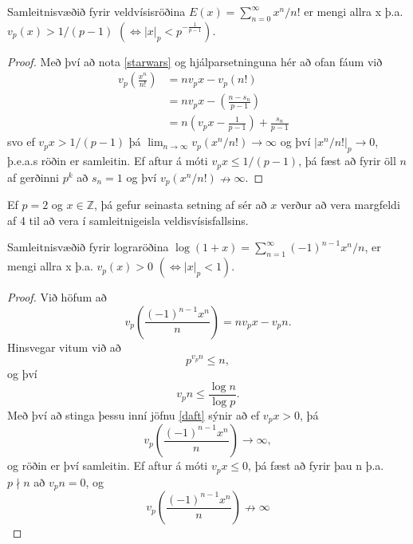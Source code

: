 \begin{setn}
Samleitnisvæðið fyrir veldvísisröðina $E(x) = \sum_{n=0}^{\infty} x^n/n!$ er mengi allra x þ.a.
$v_p(x)>1/(p-1)$  $(\iff |x|_p < p^{- \frac{1}{p-1}} )$.
\end{setn}
\begin{proof}
Með því að nota \ref{starwars} og hjálparsetninguna hér að ofan fáum við
\begin{align*}
v_p \left( \frac{x^n}{n!} \right) & =  n v_p x - v_p(n!) & \\
 & =  n v_p x - \left( \frac{n - s_n}{p-1} \right) &\\ 
 & =  n \left( v_p x - \frac{1}{p-1} \right) + \frac{s_n}{p-1}&
\end{align*}
svo ef $v_p x > 1/(p-1)$ þá $\lim_{n\rightarrow \infty } v_p (x^n/n!) \rightarrow \infty$ 
og því $|x^n/n!|_p \rightarrow 0$, þ.e.a.s röðin er samleitin.
Ef aftur á móti $v_px \leq 1/(p-1)$, þá fæst að fyrir öll $n$ af gerðinni $p^k$ að $s_n = 1$ og því $v_p(x^n/n!) \nrightarrow \infty$.
\end{proof}
\begin{daemi}
Ef $p=2$ og $x \in \mathbb{Z}$, þá gefur seinasta setning af sér að $x$ verður að vera margfeldi af 4 til að vera í samleitnigeisla veldisvísisfallsins. 
\end{daemi}

\begin{setn}
Samleitnisvæðið fyrir lograröðina $\log(1+x) = \sum_{n=1}^{\infty} (-1)^{n-1}x^n/n$, er mengi allra x þ.a. $v_p(x)>0$  $(\iff |x|_p<1)$.
\end{setn}
\begin{proof}
Við höfum að 
\begin{equation} \label{daft}
v_p \left( \frac{(-1)^{n-1}x^n}{n} \right) = n v_px - v_p n.
\end{equation}
Hinsvegar vitum við að 
\begin{equation*}
p^{v_p n} \leq n,
\end{equation*}
og því 
\begin{equation*}
v_p n \leq \frac{\log n}{\log p}.
\end{equation*}
Með því að stinga þessu inní jöfnu \ref{daft} sýnir að ef $v_p x> 0$, þá
\begin{equation*}
v_p \left( \frac{(-1)^{n-1}x^n}{n} \right) \rightarrow \infty,
\end{equation*}
og röðin er því samleitin. Ef aftur á móti $v_p x \leq 0$, þá fæst að fyrir þau n þ.a. $p \nmid n $ að $v_pn=0$, og
\begin{equation*}
v_p \left( \frac{(-1)^{n-1}x^n}{n} \right) \nrightarrow \infty
\end{equation*}
\end{proof}

